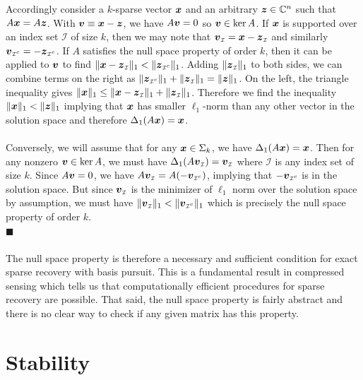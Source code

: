 \documentclass[twocolumn]{gwclass}
\renewcommand\qedsymbol{$\blacksquare$}
\newcommand{\C}{\mathbb{C}}
\begin{document}
	Accordingly consider a $k$-sparse vector $\boldsymbol{x}$ and an arbitrary $\*z\in\C^n$ such that $A\boldsymbol{x}=A\boldsymbol{z}$. With $\boldsymbol{v}\equiv\boldsymbol{x}-\boldsymbol{z}$, we have $A\boldsymbol{v}=0$ so $\boldsymbol{v}\in\ker A$. If $\boldsymbol{x}$ is supported over an index set $\mathcal{I}$ of size $k$, then we may note that $\boldsymbol{v}_{\scriptscriptstyle\mathcal{I}}=\boldsymbol{x} - \boldsymbol{z}_{\scriptscriptstyle\mathcal{I}}$ and similarly $\boldsymbol{v}_{\scriptscriptstyle\mathcal{I}^c}=-\boldsymbol{z}_{\scriptscriptstyle\mathcal{I}^c}$. If $A$ satisfies the null space property of order $k$, then it can be applied to $\boldsymbol{v}$ to find $\|\boldsymbol{x} - \boldsymbol{z}_{\scriptscriptstyle\mathcal{I}}\|_1 < \|\boldsymbol{z}_{\scriptscriptstyle\mathcal{I}^c}\|_1$. Adding $\|\boldsymbol{z}_{\scriptscriptstyle\mathcal{I}}\|_1$ to both sides, we can combine terms on the right as $ \|\boldsymbol{z}_{\scriptscriptstyle\mathcal{I}^c}\|_1 + \|\boldsymbol{z}_{\scriptscriptstyle\mathcal{I}}\|_1 = \|\boldsymbol{z}\|_1 $. On the left, the triangle inequality gives $\|\boldsymbol{x}\|_1\leq \|\boldsymbol{x} - \boldsymbol{z}_{\scriptscriptstyle\mathcal{I}}\|_1 + \|\boldsymbol{z}_{\scriptscriptstyle\mathcal{I}}\|_1$. Therefore we find the inequality $\|\boldsymbol{x}\|_1 < \|\boldsymbol{z}\|_1$ implying that $\boldsymbol{x}$ has smaller $\ell_1$-norm than any other vector in the solution space and therefore $\Delta_1(A\boldsymbol{x})=\boldsymbol{x}$.
	\\
	\\
	Conversely, we will assume that for any $\boldsymbol{x}\in\Sigma_k$, we have $\Delta_1(A\boldsymbol{x})=\boldsymbol{x}$. Then for any nonzero $\boldsymbol{v}\in\ker A$, we must have $\Delta_1(A\boldsymbol{v}_{\scriptscriptstyle\mathcal{I}})=\boldsymbol{v}_{\scriptscriptstyle\mathcal{I}}$ where $\mathcal{I}$ is any index set of size $k$. Since $A\boldsymbol{v}=0$, we have $A\boldsymbol{v}_{\scriptscriptstyle\mathcal{I}}=A (-\boldsymbol{v}_{\scriptscriptstyle\mathcal{I}^c})$, implying that $-\boldsymbol{v}_{\scriptscriptstyle\mathcal{I}^c}$ is in the solution space. But since $\boldsymbol{v}_{\scriptscriptstyle\mathcal{I}}$ is the minimizer of $\ell_1$ norm over the solution space by assumption, we must have $\|\boldsymbol{v}_{\scriptscriptstyle\mathcal{I}}\|_1 < \|\boldsymbol{v}_{\scriptscriptstyle\mathcal{I}^c}\|_1$ which is precisely the null space property of order $k$.
	\\
	\qedsymbol
	\\\\
	The null space property is therefore a necessary and sufficient condition for exact sparse recovery with basis pursuit. This is a fundamental result in compressed sensing which tells us that computationally efficient procedures for sparse recovery are possible. That said, the null space property is fairly abstract and there is no clear way to check if any given matrix has this property.
	
	\section{Stability}
\end{document}
